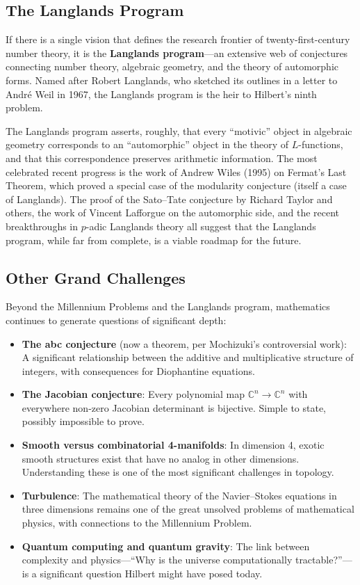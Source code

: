 \subsection{The Langlands Program}

If there is a single vision that defines the research frontier of twenty-first-century number theory, it is the \textbf{Langlands program}---an extensive web of conjectures connecting number theory, algebraic geometry, and the theory of automorphic forms. Named after Robert Langlands, who sketched its outlines in a letter to Andr\'e Weil in 1967, the Langlands program is the heir to Hilbert's ninth problem.

The Langlands program asserts, roughly, that every ``motivic'' object in algebraic geometry corresponds to an ``automorphic'' object in the theory of $L$-functions, and that this correspondence preserves arithmetic information. The most celebrated recent progress is the work of Andrew Wiles (1995) on Fermat's Last Theorem, which proved a special case of the modularity conjecture (itself a case of Langlands). The proof of the Sato--Tate conjecture by Richard Taylor and others, the work of Vincent Lafforgue on the automorphic side, and the recent breakthroughs in $p$-adic Langlands theory all suggest that the Langlands program, while far from complete, is a viable roadmap for the future.

\subsection{Other Grand Challenges}

Beyond the Millennium Problems and the Langlands program, mathematics continues to generate questions of significant depth:

\begin{itemize}
    \item \textbf{The abc conjecture} (now a theorem, per Mochizuki's controversial work): A significant relationship between the additive and multiplicative structure of integers, with consequences for Diophantine equations.
    \item \textbf{The Jacobian conjecture}: Every polynomial map $\mathbb{C}^n \to \mathbb{C}^n$ with everywhere non-zero Jacobian determinant is bijective. Simple to state, possibly impossible to prove.
    \item \textbf{Smooth versus combinatorial 4-manifolds}: In dimension 4, exotic smooth structures exist that have no analog in other dimensions. Understanding these is one of the most significant challenges in topology.
    \item \textbf{Turbulence}: The mathematical theory of the Navier--Stokes equations in three dimensions remains one of the great unsolved problems of mathematical physics, with connections to the Millennium Problem.
    \item \textbf{Quantum computing and quantum gravity}: The link between complexity and physics---``Why is the universe computationally tractable?''---is a significant question Hilbert might have posed today.
\end{itemize}

